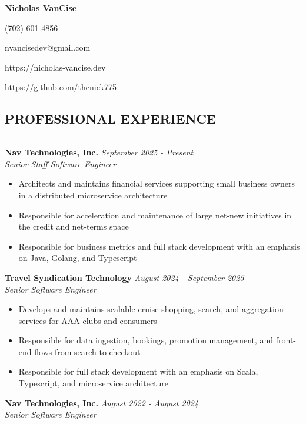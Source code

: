 \documentclass{res}
\begin{document}
	\thispagestyle{empty} %
	\centerline{\bf \Large{Nicholas VanCise}}
	\centerline{(702) 601-4856}
	\centerline{nvancisedev@gmail.com}
    \centerline{https://nicholas-vancise.dev}
    \centerline{https://github.com/thenick775}
    \vspace{-18pt}

	\begin{resume}

		\section{{PROFESSIONAL EXPERIENCE}}
    \noindent\rule[0.5ex]{\linewidth}{1pt}
            {\bf Nav Technologies, Inc.} \hfill \emph{September 2025 - Present} \\
			\emph{Senior Staff Software Engineer}

			\begin{itemize} \itemsep -2pt
				\item Architects and maintains financial services supporting small business owners in a distributed microservice architecture
				\item Responsible for acceleration and maintenance of large net-new initiatives in the credit and net-terms space
				\item Responsible for business metrics and full stack development with an emphasis on Java, Golang, and Typescript
			\end{itemize} \vspace{-2mm}
            
            {\bf Travel Syndication Technology} \hfill \emph{August 2024 - September 2025} \\
			\emph{Senior Software Engineer}

            \begin{itemize} \itemsep -2pt
                \item Develops and maintains scalable cruise shopping, search, and aggregation services for AAA clubs and consumers  
                \item Responsible for data ingestion, bookings, promotion management, and front-end flows from search to checkout
                \item Responsible for full stack development with an emphasis on Scala, Typescript, and microservice architecture
            \end{itemize} \vspace{-2mm}

    		{\bf Nav Technologies, Inc.} \hfill \emph{August 2022 - August 2024} \\
			\emph{Senior Software Engineer}


\end{resume}
\end{document}
